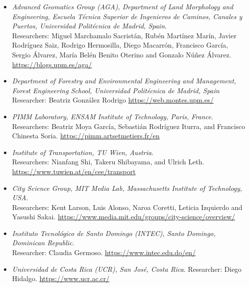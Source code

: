 \begin{itemize}

    \item \textit{Advanced Geomatics Group (AGA), Department of Land Morphology and Engineering, Escuela Técnica Superior de Ingenieros de Caminos, Canales y Puertos, Universidad Politécnica de Madrid, Spain}.\\
    Researchers: Miguel Marchamalo Sacristán, Rubén Martínez Marín, Javier Rodríguez Saiz, Rodrigo Hermosilla, Diego Macarrón, Francisco García, Sergio Álvarez, María Belén Benito Oterino and Gonzalo Núñez Álvarez. 
    \url{https://blogs.upm.es/aga/}

    \item \textit{Department of Forestry and Environmental Engineering and Management, Forest Engineering School, Universidad Politécnica de Madrid, Spain} \\ 
    Researcher: Beatriz González Rodrigo
    \url{https://web.montes.upm.es/}
    
    \item \textit{PIMM Laboratory, ENSAM Institute of Technology, Paris, France}.\\
    Researchers: Beatriz Moya García, Sebastián Rodríguez Iturra, and Francisco Chinesta Soria.
    \url{https://pimm.artsetmetiers.fr/en}
    
    \item \textit{Institute of Transportation, TU Wien, Austria}.\\
    Researchers: Nianfang Shi, Takeru Shibayama, and Ulrich Leth.
    \url{https://www.tuwien.at/en/cee/transport}
    
    \item \textit{City Science Group, MIT Media Lab, Massachusetts Institute of Technology, USA}.\\
    Researchers: Kent Larson, Luis Alonso, Naroa Coretti, Leticia Izquierdo and Yasushi Sakai.
    \url{https://www.media.mit.edu/groups/city-science/overview/}
    
    \item \textit{Instituto Tecnológico de Santo Domingo (INTEC), Santo Domingo, Dominican Republic}.\\
    Researcher: Claudia Germoso.
    \url{https://www.intec.edu.do/en/}
    
    \item \textit{Universidad de Costa Rica (UCR), San José, Costa Rica}.
    Researcher: Diego Hidalgo.
    \url{https://www.ucr.ac.cr/}
    

\end{itemize}
